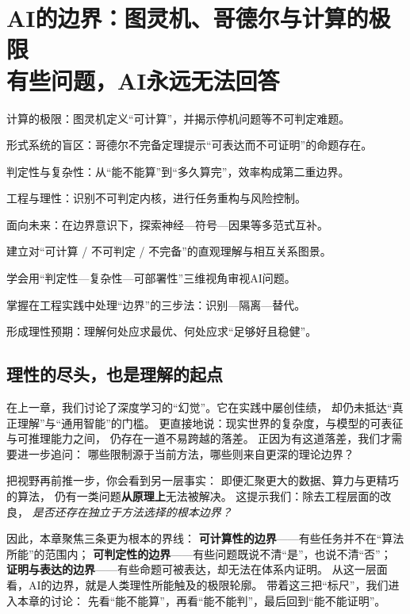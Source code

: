 \chapter{AI的边界：图灵机、哥德尔与计算的极限 \texorpdfstring{\\}{ }有些问题，AI永远无法回答}

\begin{introduction}[本章提要]
  \item 计算的极限：图灵机定义“可计算”，并揭示停机问题等不可判定难题。
  \item 形式系统的盲区：哥德尔不完备定理提示“可表达而不可证明”的命题存在。
  \item 判定性与复杂性：从“能不能算”到“多久算完”，效率构成第二重边界。
  \item 工程与理性：识别不可判定内核，进行任务重构与风险控制。
  \item 面向未来：在边界意识下，探索神经—符号—因果等多范式互补。
\end{introduction}

\begin{introduction}[你将收获]
  \item 建立对“可计算 / 不可判定 / 不完备”的直观理解与相互关系图景。
  \item 学会用“判定性—复杂性—可部署性”三维视角审视AI问题。
  \item 掌握在工程实践中处理“边界”的三步法：识别—隔离—替代。
  \item 形成理性预期：理解何处应求最优、何处应求“足够好且稳健”。
\end{introduction}

\section*{理性的尽头，也是理解的起点}

在上一章，我们讨论了深度学习的“幻觉”。它在实践中屡创佳绩，  
却仍未抵达“真正理解”与“通用智能”的门槛。  
更直接地说：现实世界的复杂度，与模型的可表征与可推理能力之间，  
仍存在一道不易跨越的落差。  
正因为有这道落差，我们才需要进一步追问：  
哪些限制源于当前方法，哪些则来自更深的理论边界？

把视野再前推一步，你会看到另一层事实：  
即便汇聚更大的数据、算力与更精巧的算法，  
仍有一类问题\textbf{从原理上}无法被解决。  
这提示我们：除去工程层面的改良，  
\textit{是否还存在独立于方法选择的根本边界？}

因此，本章聚焦三条更为根本的界线：  
\textbf{可计算性的边界}——有些任务并不在“算法所能”的范围内；  
\textbf{可判定性的边界}——有些问题既说不清“是”，也说不清“否”；  
\textbf{证明与表达的边界}——有些命题可被表达，却无法在体系内证明。  
从这一层面看，AI的边界，就是人类理性所能触及的极限轮廓。  
带着这三把“标尺”，我们进入本章的讨论：  
先看“能不能算”，再看“能不能判”，最后回到“能不能证明”。


